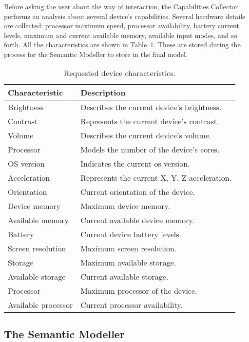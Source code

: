 Before asking the user about the way of interaction, the Capabilities Collector
performs an analysis about several device's capabilities. Several hardware
details are collected: processor maximum speed, processor availability, battery
current levels, maximum and current available memory, available input modes, 
and so forth. All the characteristics are shown in Table~\ref{tbl:device_characteristics}. 
These are stored during the process for the Semantic Modeller to store in the 
final model.

\begin{table}[H]
  \caption{Requested device characteristics.}
 \label{tbl:device_characteristics}
\footnotesize
\centering
 \begin{tabular}{l l}
  \hline 
  \textbf{Characteristic}& \textbf{Description}				\\
  \hline
  Brightness		& Describes the current device’s brightness.	\\
  Contrast		& Represents the current device’s contrast.	\\
  Volume		& Describes the current device’s volume.	\\
  Processor		& Models the number of the device’s cores.	\\
  OS version		& Indicates the current	\ac{os} version.	\\
  Acceleration		& Represents the current X, Y, Z acceleration.	\\
  Orientation		& Current orientation of the device.		\\
  Device memory		& Maximum device memory.			\\
  Available memory	& Current available device memory.		\\
  Battery		& Current device battery levels.		\\
  Screen resolution	& Maximum screen resolution.			\\
  Storage		& Maximum available storage.			\\
  Available storage	& Current available storage.			\\
  Processor		& Maximum processor of the device.		\\
  Available processor	& Current processor availability.		\\
  \hline
\end{tabular}
\end{table}


\subsection{The Semantic Modeller}
\label{sec:semantic_modeller}

